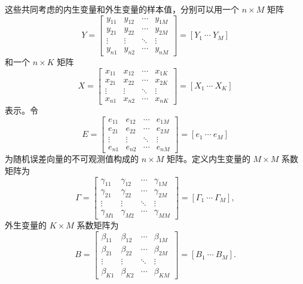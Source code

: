 这些共同考虑的内生变量和外生变量的样本值，分别可以用一个 $n\times M$ 矩阵
\[
 Y=
 \begin{bmatrix}
  y_{11}&y_{12}&\cdots&y_{1M}\\
  y_{21}&y_{22}&\cdots&y_{2M}\\
  \vdots&\vdots&\ddots&\vdots\\
  y_{n1}&y_{n2}&\cdots&y_{nM}
 \end{bmatrix}
 =[Y_1\ \cdots\ Y_M]
\]
和一个 $n\times K$ 矩阵
\[
 X=
 \begin{bmatrix}
  x_{11}&x_{12}&\cdots&x_{1K}\\
  x_{21}&x_{22}&\cdots&x_{2K}\\
  \vdots&\vdots&\ddots&\vdots\\
  x_{n1}&x_{n2}&\cdots&x_{nK}
 \end{bmatrix}
 =[X_1\ \cdots\ X_K]
\]
表示。令
\[
 E=
 \begin{bmatrix}
  e_{11}&e_{12}&\cdots&e_{1M}\\
  e_{21}&e_{22}&\cdots&e_{2M}\\
  \vdots&\vdots&\ddots&\vdots\\
  e_{n1}&e_{n2}&\cdots&e_{nM}
 \end{bmatrix}
 =[e_1\ \cdots\ e_M]
\]
为随机误差向量的不可观测值构成的 $n\times M$ 矩阵。定义内生变量的 $M\times M$ 系数矩阵为
\[
 \Gamma=
 \begin{bmatrix}
  \gamma_{11}&\gamma_{12}&\cdots&\gamma_{1M}\\
  \gamma_{21}&\gamma_{22}&\cdots&\gamma_{2M}\\
  \vdots&\vdots&\ddots&\vdots\\
  \gamma_{M1}&\gamma_{M2}&\cdots&\gamma_{MM}
 \end{bmatrix}
 =[\Gamma_1\ \cdots\ \Gamma_M],
\]
外生变量的 $K\times M$ 系数矩阵为
\[
 B=
 \begin{bmatrix}
  \beta_{11}&\beta_{12}&\cdots&\beta_{1M}\\
  \beta_{21}&\beta_{22}&\cdots&\beta_{2M}\\
  \vdots&\vdots&\ddots&\vdots\\
  \beta_{K1}&\beta_{K2}&\cdots&\beta_{KM}
 \end{bmatrix}
 =[B_1\ \cdots\ B_M].
\]

